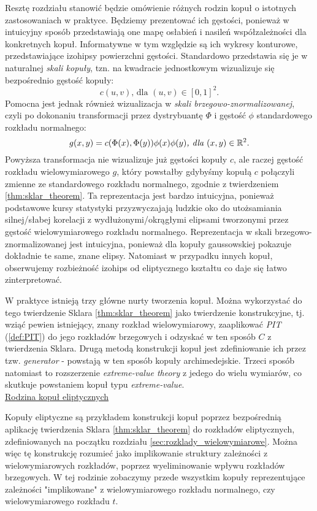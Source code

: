 Resztę rozdziału stanowić będzie omówienie różnych rodzin kopuł o istotnych zastosowaniach w praktyce. Będziemy prezentować ich gęstości, ponieważ w intuicyjny sposób przedstawiają one mapę osłabień i nasileń współzależności dla konkretnych kopuł. Informatywne w tym względzie są ich wykresy konturowe, przedstawiające izohipsy powierzchni gęstości. Standardowo przedstawia się je w naturalnej \emph{skali kopuły}, tzn. na kwadracie jednostkowym wizualizuje się bezpośrednio gęstość kopuły:
$$ c(u, v)\text{, dla } (u, v) \in [0, 1]^2.$$
Pomocna jest jednak również wizualizacja w \emph{skali brzegowo-znormalizowanej}, czyli po dokonaniu transformacji przez dystrybuantę $\Phi$ i gęstość $\phi$ standardowego rozkładu normalnego:
 $$ g(x, y) = c(\Phi(x), \Phi(y))\phi(x)\phi(y)\textit{, dla }(x,y)\in\mathbb{R}^2.$$
Powyższa transformacja nie wizualizuje już gęstości kopuły $c$, ale raczej gęstość rozkładu wielowymiarowego $g$, który powstałby gdybyśmy kopułą $c$ połączyli zmienne ze standardowego rozkładu normalnego, zgodnie z twierdzeniem \ref{thm:sklar_theorem}. Ta reprezentacja jest bardzo intuicyjna, ponieważ podstawowe kursy statystyki przyzwyczajają ludzkie oko do utożsamiania silnej/słabej korelacji z wydłużonymi/okrągłymi elipsami tworzonymi przez gęstość wielowymiarowego rozkładu normalnego. Reprezentacja w skali brzegowo-znormalizowanej jest intuicyjna, ponieważ dla kopuły gaussowskiej pokazuje dokładnie te same, znane elipsy. Natomiast w przypadku innych kopuł, obserwujemy rozbieżność izohips od eliptycznego kształtu co daje się łatwo zinterpretować. 

W praktyce istnieją trzy główne nurty tworzenia kopuł. Można wykorzystać do tego twierdzenie Sklara \ref{thm:sklar_theorem} jako twierdzenie konstrukcyjne, tj. wziąć pewien istniejący, znany rozkład wielowymiarowy, zaaplikować \emph{PIT} (\ref{def:PIT}) do jego rozkładów brzegowych i odzyskać w ten sposób $C$ z twierdzenia Sklara. Drugą metodą konstrukcji kopuł jest zdefiniowanie ich przez tzw. \emph{generator} - powstają w ten sposób kopuły archimedejskie. Trzeci sposób natomiast to rozszerzenie \emph{extreme-value theory} z jedego do wielu wymiarów, co skutkuje powstaniem kopuł typu \emph{extreme-value}.\\

\underline{Rodzina kopuł eliptycznych}
\vspace{0.5cm}

Kopuły eliptyczne są przykładem konstrukcji kopuł poprzez bezpośrednią aplikację twierdzenia Sklara \ref{thm:sklar_theorem} do rozkładów eliptycznych, zdefiniowanych na początku rozdziału \ref{sec:rozklady_wielowymiarowe}. Można więc tę konstrukcję rozumieć jako implikowanie struktury zależności z wielowymiarowych rozkładów, poprzez wyeliminowanie wpływu rozkładów brzegowych. W tej rodzinie zobaczymy przede wszystkim kopuły reprezentujące zależności "implikowane" z wielowymiarowego rozkładu normalnego, czy wielowymiarowego rozkładu $t$.

